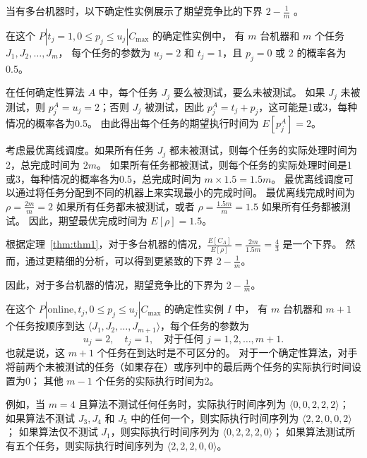 当有多台机器时，以下确定性实例展示了期望竞争比的下界 \( 2 - \frac{1}{m} \) \cite{albers2021scheduling}。

\begin{exm}
    \label{exm2}
    在这个 \( P | t_j = 1, 0 \leq p_j \leq u_j | C_{\max} \) 的确定性实例中，
    有 \( m \) 台机器和 \( m \) 个任务 \( J_1, J_2, \ldots, J_m \)，
    每个任务的参数为 \( u_j = 2 \) 和 \( t_j = 1 \)，且 \( p_j = 0 \) 或 \( 2 \) 的概率各为0.5。

    在任何确定性算法 \( A \) 中，每个任务 \( J_j \) 要么被测试，要么未被测试。
    如果 \( J_j \) 未被测试，则 \( p^A_j = u_j = 2 \)；否则 \( J_j \) 被测试，因此 \( p^A_j = t_j + p_j \)，这可能是1或3，每种情况的概率各为0.5。
    由此得出每个任务的期望执行时间为 \( E[p^A_j] = 2 \)。
    
    考虑最优离线调度。如果所有任务 \( J_j \) 都未被测试，则每个任务的实际处理时间为2，总完成时间为 \( 2m \)。
    如果所有任务都被测试，则每个任务的实际处理时间是1或3，每种情况的概率各为0.5，总完成时间为 \( m \times 1.5 = 1.5m \)。
    最优离线调度可以通过将任务分配到不同的机器上来实现最小的完成时间。
    最优离线完成时间为 \( \rho = \frac{2m}{m} = 2 \) 如果所有任务都未被测试，或者 \( \rho = \frac{1.5m}{m} = 1.5 \) 如果所有任务都被测试。
    因此，期望最优完成时间为 \( E[\rho] = 1.5 \)。
    
    根据定理~\ref{thm:thm1}，对于多台机器的情况，\( \frac{E[C_A]}{E[\rho]} = \frac{2m}{1.5m} = \frac{4}{3} \) 是一个下界。
    然而，通过更精细的分析，可以得到更紧致的下界 \( 2 - \frac{1}{m} \)。
    
    因此，对于多台机器的情况，期望竞争比的下界为 \( 2 - \frac{1}{m} \)。
\end{exm}

\begin{exm}
    \label{exm3}
    在这个 \( P | \text{online}, t_j, 0 \leq p_j \leq u_j | C_{\max} \) 的确定性实例 \( I \) 中，
    有 \( m \) 台机器和 \( m + 1 \) 个任务按顺序到达 \( \langle J_1, J_2, \ldots, J_{m+1} \rangle \)，每个任务的参数为
    \[ u_j = 2, \quad t_j = 1, \quad \text{对于任何 } j = 1, 2, \ldots, m + 1. \]
    也就是说，这 \( m + 1 \) 个任务在到达时是不可区分的。
    对于一个确定性算法，对手将前两个未被测试的任务（如果存在）或序列中的最后两个任务的实际执行时间设置为0；
    其他 \( m - 1 \) 个任务的实际执行时间为2。
    
    例如，当 \( m = 4 \) 且算法不测试任何任务时，实际执行时间序列为 \( \langle 0, 0, 2, 2, 2 \rangle \)；
    如果算法不测试 \( J_3, J_4 \) 和 \( J_5 \) 中的任何一个，则实际执行时间序列为 \( \langle 2, 2, 0, 0, 2 \rangle \)；
    如果算法仅不测试 \( J_1 \)，则实际执行时间序列为 \( \langle 0, 2, 2, 2, 0 \rangle \)；
    如果算法测试所有五个任务，则实际执行时间序列为 \( \langle 2, 2, 2, 0, 0 \rangle \)。
\end{exm}

